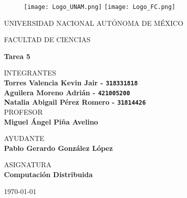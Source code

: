 \thispagestyle{empty}

\begin{figure}[ht]
  \texttt{[image: Logo\_UNAM.png]}
  \label{EscudoUNAM}
  \endminipage
  \texttt{[image: Logo\_FC.png]}
  \label{EscudoFC}
  \endminipage
\end{figure}

\begin{center}
  \vspace{0.8cm}
  \LARGE
  UNIVERSIDAD NACIONAL AUTÓNOMA DE MÉXICO 
  
  \vspace{0.7cm}
  \LARGE
  FACULTAD DE CIENCIAS
  
  \vspace{0.8 cm}	
  \Large
  \textbf{Tarea 5}

  \vspace{0.8 cm}
  \normalsize	
  INTEGRANTES \\
  \vspace{.2cm}
  \large
  \textbf{Torres Valencia Kevin Jair - \texttt{318331818}}\\
  \textbf{Aguilera Moreno Adrián - \texttt{421005200}}\\
  \textbf{Natalia Abigail Pérez Romero  - \texttt{31814426}}\\
  
  \vspace{1 cm}
  \normalsize	
  PROFESOR \\
  \vspace{.2cm}
  \large
  \textbf{Miguel Ángel Piña Avelino}
  
  \vspace{1 cm}
  AYUDANTE \\
  \vspace{.2cm}
  \large
  \textbf{Pablo Gerardo González López}
  \vspace{1.3cm}
  
  \normalsize	
  ASIGNATURA \\
  \vspace{.2cm}
  \large
  \textbf{Computación Distribuida}
  
  \vspace{1 cm}
  \today
\end{center}
